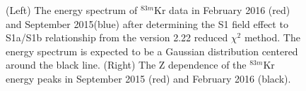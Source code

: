 \documentclass[a4paper,12pt]{article}
\begin{document}
{\begin{figure} [h!]
\centering
{}
\qquad
{}
\caption{ (Left) The energy spectrum of $^{83m}$Kr data in February 2016 (red) and September 2015(blue) after determining the S1 field effect to S1a/S1b relationship from the version 2.22 reduced $\chi^2$ method. The energy spectrum is expected to be a Gaussian distribution centered around the black line.  (Right) The Z dependence of the $^{83m}$Kr energy peaks in September 2015 (red) and February 2016 (black).}
\label{Kr2p20}
\end{figure}

\newpage

}
\end{document}
